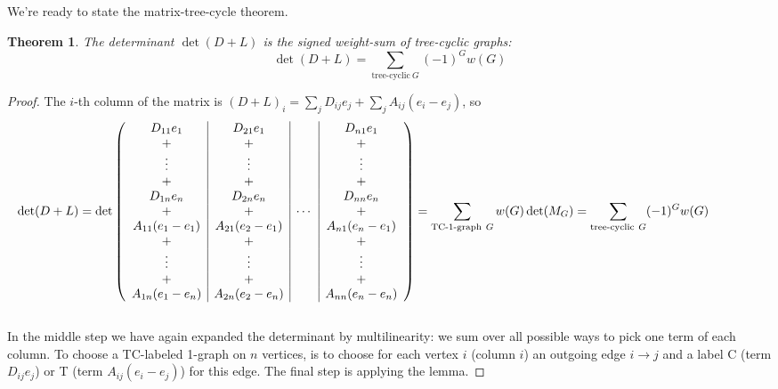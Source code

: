 \documentclass[a4paper, 11pt]{article}
\newtheorem{theorem}{Theorem}[section]
\theoremstyle{definition}
\begin{document}
We’re ready to state the matrix-tree-cycle theorem.

\begin{theorem} The determinant $\det(D+L)$ is the signed weight-sum of tree-cyclic graphs:
  \[
    \det(D + L) = \sum_{\text{tree-cyclic}\ G} (-1)^G w(G)
  \]
\end{theorem}
\begin{proof}
  The $i$-th column of the matrix is $(D + L)_i = \sum_j D_{ij} e_j + \sum_j A_{ij}(e_i - e_j)$, so \\
  \begin{align*}
    \hspace*{-1.5cm}
    \det(D + L) = \det \left(
    \begin{array}{c|c|c|c}
      D_{11} e_1         & D_{21} e_1         &        & D_{n1} e_1          \\
      +                  & +                  &        & +                   \\
      \vdots             & \vdots             &        & \vdots              \\
      +                  & +                  &        & +                   \\
      D_{1n} e_n         & D_{2n} e_n         &        & D_{nn} e_n          \\
      +                  & +                  & \cdots & +                   \\
      A_{11} (e_1 - e_1) & A_{21} (e_2 - e_1) &        & A_{n1} (e_n - e_1)  \\
      +                  & +                  &        & +                   \\
      \vdots             & \vdots             &        & \vdots              \\
      +                  & +                  &        & +                   \\
      A_{1n} (e_1 - e_n) & A_{2n} (e_2 - e_n) &        & A_{nn} (e_n - e_n)
    \end{array} \right)
    = \sum_{\text{TC-1-graph}\ G} w(G) \det(M_G)
    = \sum_{\text{tree-cyclic}\ G} (-1)^G w(G)
  \end{align*} \\
  In the middle step we have again expanded the determinant by multilinearity: we sum over all possible ways to pick one term of each column. To choose a TC-labeled 1-graph on $n$ vertices, is to choose for each vertex $i$ (column $i$) an outgoing edge $i \to j$ and a label C (term $D_{ij} e_j$) or T (term $A_{ij}(e_i - e_j)$) for this edge. The final step is applying the lemma.
\end{proof}
\end{document}
